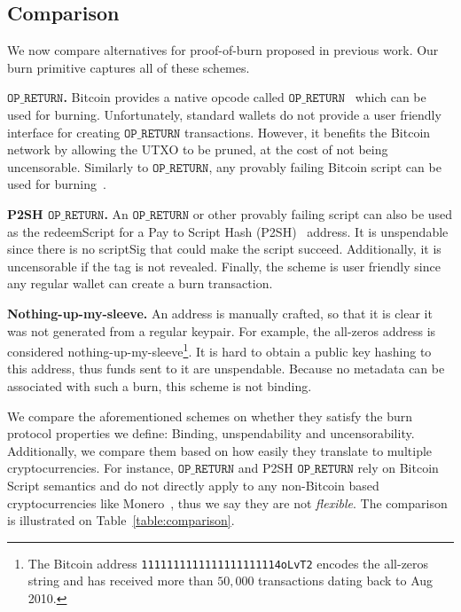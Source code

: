 \subsection{Comparison}

We now compare alternatives for proof-of-burn proposed in previous work. Our burn primitive captures all of these schemes.

\newcommand{\opreturn}{\texttt{OP\_RETURN}}

\noindent
\textbf{$\opreturn$.}
Bitcoin provides a native opcode called  $\opreturn$~\cite{opreturn} which can be used for burning.
Unfortunately,
standard wallets do not provide a user friendly interface for creating $\opreturn$ transactions.
However, it benefits the Bitcoin network by allowing the UTXO to be pruned, at
the cost of not being uncensorable.
Similarly to $\opreturn$, any provably failing Bitcoin script can be used for
burning~\cite{stewart}.

\noindent
\textbf{P2SH $\opreturn$.}
An $\opreturn$ or other provably failing script can also be used as the redeemScript for a Pay to Script Hash (P2SH)~\cite{p2sh} address. It is unspendable since there is no scriptSig that could make the script succeed. Additionally, it is uncensorable if the tag is not revealed. Finally, the scheme is user friendly since any regular wallet can create a burn transaction.

\noindent
\textbf{Nothing-up-my-sleeve.}
An address is manually crafted, so that it is clear it was not generated from a regular keypair. For example, the all-zeros address is considered nothing-up-my-sleeve\footnote{The Bitcoin address \texttt{1111111111111111111114oLvT2} encodes the all-zeros string and has received more than $50{,}000$ transactions dating back to Aug 2010.}. It is hard to obtain a public key hashing to this address, thus funds sent to it are unspendable. Because no metadata can be associated with such a burn, this scheme is not binding.

We compare the aforementioned schemes on whether they satisfy the burn protocol properties we define: Binding, unspendability and uncensorability. Additionally, we compare them based on how easily they translate to multiple cryptocurrencies. For instance, $\opreturn$ and P2SH $\opreturn$ rely on Bitcoin Script semantics and do not directly apply to any non-Bitcoin based cryptocurrencies like Monero~\cite{cryptonote}, thus we say they are not \emph{flexible}. The comparison is illustrated on Table~\ref{table:comparison}.

